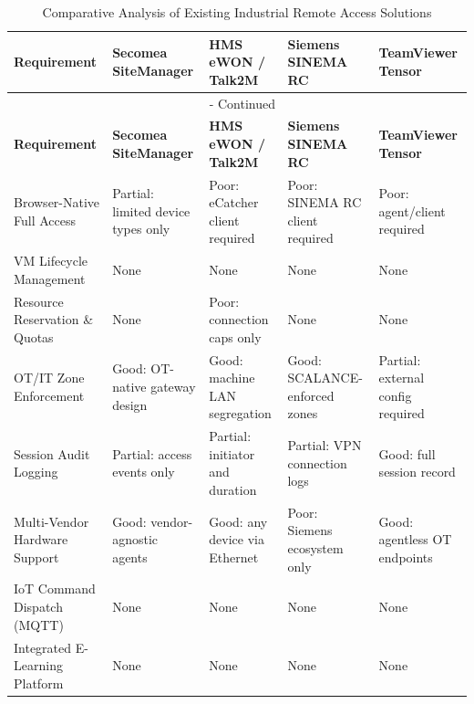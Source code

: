 \footnotesize
\begin{longtable}{|p{3.4cm}|p{2.8cm}|p{2.8cm}|p{2.8cm}|p{2.8cm}|}
\caption{Comparative Analysis of Existing Industrial Remote Access Solutions}
\label{tab:solution-comparison} \\
\hline
\textbf{Requirement}
& \textbf{Secomea SiteManager}
& \textbf{HMS eWON / Talk2M}
& \textbf{Siemens SINEMA RC}
& \textbf{TeamViewer Tensor} \\
\hline
\endfirsthead

\multicolumn{5}{c}{{\tablename\ \thetable{} - Continued}} \\[0.5em]
\hline
\textbf{Requirement}
& \textbf{Secomea SiteManager}
& \textbf{HMS eWON / Talk2M}
& \textbf{Siemens SINEMA RC}
& \textbf{TeamViewer Tensor} \\
\hline
\endhead

\hline
\endfoot

\hline
\endlastfoot

Browser-Native Full Access
& Partial: limited device types only
& Poor: eCatcher client required
& Poor: SINEMA RC client required
& Poor: agent/client required \\
\hline

VM Lifecycle Management
& None
& None
& None
& None \\
\hline

Resource Reservation \& Quotas
& None
& Poor: connection caps only
& None
& None \\
\hline

OT/IT Zone Enforcement
& Good: OT-native gateway design
& Good: machine LAN segregation
& Good: SCALANCE-
enforced zones
& Partial: external config required \\
\hline

Session Audit Logging
& Partial: access events only
& Partial: initiator and duration
& Partial: VPN connection logs
& Good: full session record \\
\hline

Multi-Vendor Hardware Support
& Good: vendor-agnostic agents
& Good: any device via Ethernet
& Poor: Siemens ecosystem only
& Good: agentless OT endpoints \\
\hline

IoT Command Dispatch (MQTT)
& None
& None
& None
& None \\
\hline

Integrated E-Learning Platform
& None
& None
& None
& None \\
\hline

\end{longtable}
\normalsize

